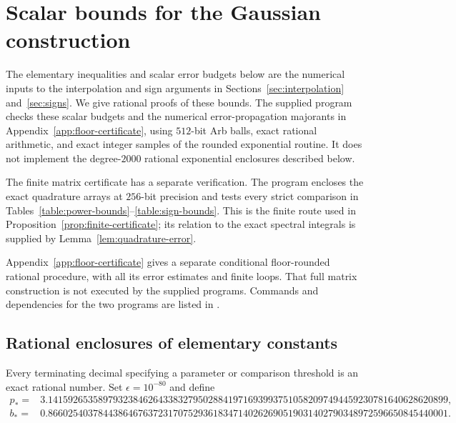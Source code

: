 \section{Scalar bounds for the Gaussian construction}
\label{sec:arithmetic}

The elementary inequalities and scalar error budgets below are the numerical
inputs to the interpolation and sign arguments in
Sections~\ref{sec:interpolation} and~\ref{sec:signs}.  We give rational
proofs of these bounds.  The supplied program
 checks these scalar budgets and the
numerical error-propagation majorants in Appendix~\ref{app:floor-certificate}, using $512$-bit Arb balls, exact rational
arithmetic, and exact integer samples of the rounded exponential routine.
It does not implement the degree-$2000$ rational exponential enclosures described below.

The finite matrix certificate has a separate verification.  The program
 encloses the exact quadrature arrays at
$256$-bit precision and tests every strict comparison in
Tables~\ref{table:power-bounds}--\ref{table:sign-bounds}.  This is the finite
route used in Proposition~\ref{prop:finite-certificate}; its relation to the
exact spectral integrals is supplied by Lemma~\ref{lem:quadrature-error}.

Appendix~\ref{app:floor-certificate} gives a separate conditional
floor-rounded rational procedure, with all its error estimates and finite
loops.  That full matrix construction is not executed by the supplied
programs.  Commands and dependencies for the two programs are listed in
.

\subsection{Rational enclosures of elementary constants}

Every terminating decimal specifying a parameter or comparison threshold is
an exact rational number.  Set $\epsilon=10^{-80}$ and define
\begingroup\small
\begin{equation}\label{eq:rational-pi-b}
\begin{split}
 p_*={}&3.14159265358979323846264338327950288419716939937510582097494459230781640628620899,\\
 b_*={}&0.86602540378443864676372317075293618347140262690519031402790348972596650845440001.
\end{split}
\end{equation}
\endgroup

